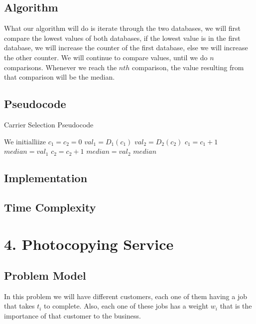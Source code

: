 \documentclass{article}
\begin{document}
\subsection*{Algorithm}

What our algorithm will do is iterate through the two databases, we will first compare the lowest values of both databases, if the lowest value is in the first database, we will increase the counter of the first database, else we will increase the other counter. We will continue to compare values, until we do $n$ comparisons. Whenever we reach the $nth$ comparison, the value resulting from that comparison will be the median.

\subsection*{Pseudocode}

\begin{algorithm}[H]
\caption{Carrier Selection Pseudocode}
\begin{algorithmic}[1]
\State We initialliize $c_1 = c_2 = 0$
 \State $val_1 = D_1(c_1)$
 \State $val_2 = D_2(c_2)$
  \State $c_1 = c_1 + 1$
  \State $median = val_1$
 \Else
  \State $c_2 = c_2 + 1$
  \State $median = val_2$
 \EndIf
\EndFor
\State \Return $median$
\end{algorithmic}
\end{algorithm}

\subsection*{Implementation}

\subsection*{Time Complexity}

\section*{4. Photocopying Service}

\subsection*{Problem Model}

In this problem we will have different customers, each one of them having a job that takes $t_i$ to complete. Also, each one of these jobs has a weight $w_i$ that is the importance of that customer to the business.
\end{document}
